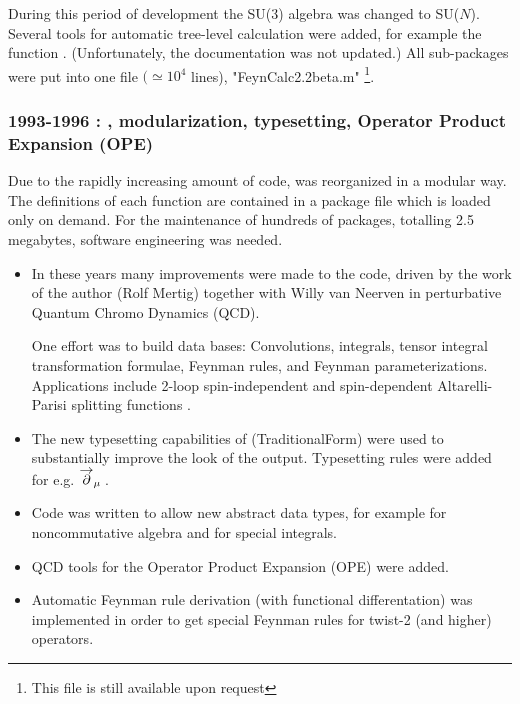 During this period of development the SU(3) algebra was changed to SU($N$). Several tools for automatic tree-level calculation were added, for example the function . (Unfortunately, the  documentation was not updated.) All sub-packages were put into one file \(\big(\simeq {{10}^4}\) lines), "FeynCalc2.2beta.m" \footnote{This file is still available upon request}.

\subsubsection*{1993-1996 : , modularization, typesetting, Operator Product Expansion (OPE)}

Due to the rapidly increasing amount of code, \fc was reorganized in a modular way. The definitions of each function are contained in a package file which is loaded only on demand. For the maintenance of hundreds of packages, totalling 2.5 megabytes, software engineering was needed.

\begin{itemize}

\item
In these years many improvements were made to the code, driven by the work of the author (Rolf Mertig) 
together with Willy van Neerven in perturbative Quantum Chromo Dynamics (QCD).

One effort was to build data bases: Convolutions, integrals, tensor integral transformation
formulae, Feynman rules,
and Feynman parameterizations. 
Applications include 2-loop spin-independent and spin-dependent Altarelli-Parisi splitting
functions \cite{Altarelli:1977zs}.

\item The new typesetting capabilities of  (TraditionalForm) were used to substantially
improve the look of the output.
Typesetting rules were added for e.g. \({\overvar{\partial }{\rightarrow}}_{\mu } \multsp \).

\item Code was written to allow new abstract data types, for example for noncommutative algebra
 and for special integrals.

\item QCD tools for the Operator Product Expansion  (OPE)
were added.

\item Automatic Feynman rule derivation (with functional
differentation) was implemented in order to get special Feynman rules
for twist-2 (and higher) operators.

\end{itemize}


